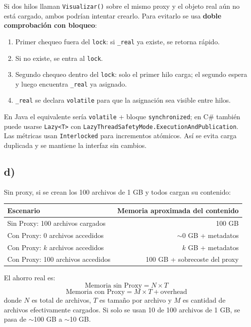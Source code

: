 \documentclass[11pt,a4paper]{article}
\begin{document}
Si dos hilos llaman \texttt{Visualizar()} sobre el mismo proxy y el objeto real aún no está cargado, ambos podrían intentar crearlo. Para evitarlo se usa \textbf{doble comprobación con bloqueo}:
\begin{enumerate}
    \item Primer chequeo fuera del \texttt{lock}: si \texttt{\_real} ya existe, se retorna rápido.
    \item Si no existe, se entra al \texttt{lock}.
    \item Segundo chequeo dentro del \texttt{lock}: solo el primer hilo carga; el segundo espera y luego encuentra \texttt{\_real} ya asignado.
    \item \texttt{\_real} se declara \texttt{volatile} para que la asignación sea visible entre hilos.
\end{enumerate}

En Java el equivalente sería \texttt{volatile} + bloque \texttt{synchronized}; en C\# también puede usarse \texttt{Lazy<T>} con \texttt{LazyThreadSafetyMode.ExecutionAndPublication}. Las métricas usan \texttt{Interlocked} para incrementos atómicos. Así se evita carga duplicada y se mantiene la interfaz sin cambios.

\subsection*{d)}

Sin proxy, si se crean los 100 archivos de 1 GB y todos cargan su contenido:

\begin{table}[h]
\centering
\begin{tabular}{lr}
\toprule
Escenario & Memoria aproximada del contenido \\
\midrule
Sin Proxy: 100 archivos cargados & 100 GB \\
Con Proxy: 0 archivos accedidos & \(\sim\)0 GB + metadatos \\
Con Proxy: \(k\) archivos accedidos & \(k\) GB + metadatos \\
Con Proxy: 100 archivos accedidos & 100 GB + sobrecoste del proxy \\
\bottomrule
\end{tabular}
\end{table}

El ahorro real es:
\[
\text{Memoria sin Proxy} = N \times T
\]
\[
\text{Memoria con Proxy} = M \times T + \text{overhead}
\]
donde \(N\) es total de archivos, \(T\) es tamaño por archivo y \(M\) es cantidad de archivos efectivamente cargados. Si solo se usan 10 de 100 archivos de 1 GB, se pasa de \(\sim\)100 GB a \(\sim\)10 GB.
\end{document}
